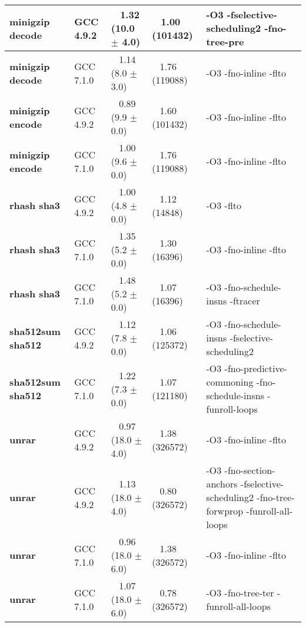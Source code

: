 \begin{tabular}{|l|l|p{0.9in}|p{0.9in}|p{3.0in}|}
     \hline
      \textbf{ minigzip decode } &  GCC 4.9.2  &  ~ 1.32 (10.0 $\pm$ 4.0)  &  ~ 1.00 (101432)  & {\small -O3 -fselective-scheduling2 -fno-tree-pre }\\
     \hline
      \textbf{ minigzip decode } &  GCC 7.1.0  &  ~ 1.14 (8.0 $\pm$ 3.0)  &  ~ 1.76 (119088)  & {\small -O3 -fno-inline -flto }\\
     \hline
      \textbf{ minigzip encode } &  GCC 4.9.2  &  ~ 0.89 (9.9 $\pm$ 0.0)  &  ~ 1.60 (101432)  & {\small -O3 -fno-inline -flto }\\
     \hline
      \textbf{ minigzip encode } &  GCC 7.1.0  &  ~ 1.00 (9.6 $\pm$ 0.0)  &  ~ 1.76 (119088)  & {\small -O3 -fno-inline -flto }\\
     \hline
      \textbf{ rhash sha3 } &  GCC 4.9.2  &  ~ 1.00 (4.8 $\pm$ 0.0)  &  ~ 1.12 (14848)  & {\small -O3 -flto }\\
     \hline
      \textbf{ rhash sha3 } &  GCC 7.1.0  &  ~ 1.35 (5.2 $\pm$ 0.0)  &  ~ 1.30 (16396)  & {\small -O3 -fno-inline -flto }\\
     \hline
      \textbf{ rhash sha3 } &  GCC 7.1.0  &  ~ 1.48 (5.2 $\pm$ 0.0)  &  ~ 1.07 (16396)  & {\small -O3 -fno-schedule-insns -ftracer }\\
     \hline
      \textbf{ sha512sum sha512 } &  GCC 4.9.2  &  ~ 1.12 (7.8 $\pm$ 0.0)  &  ~ 1.06 (125372)  & {\small -O3 -fno-schedule-insns -fselective-scheduling2 }\\
     \hline
      \textbf{ sha512sum sha512 } &  GCC 7.1.0  &  ~ 1.22 (7.3 $\pm$ 0.0)  &  ~ 1.07 (121180)  & {\small -O3 -fno-predictive-commoning -fno-schedule-insns -funroll-loops }\\
     \hline
      \textbf{ unrar } &  GCC 4.9.2  &  ~ 0.97 (18.0 $\pm$ 4.0)  &  ~ 1.38 (326572)  & {\small -O3 -fno-inline -flto }\\
     \hline
      \textbf{ unrar } &  GCC 4.9.2  &  ~ 1.13 (18.0 $\pm$ 4.0)  &  ~ 0.80 (326572)  & {\small -O3 -fno-section-anchors -fselective-scheduling2 -fno-tree-forwprop -funroll-all-loops }\\
     \hline
      \textbf{ unrar } &  GCC 7.1.0  &  ~ 0.96 (18.0 $\pm$ 6.0)  &  ~ 1.38 (326572)  & {\small -O3 -fno-inline -flto }\\
     \hline
      \textbf{ unrar } &  GCC 7.1.0  &  ~ 1.07 (18.0 $\pm$ 6.0)  &  ~ 0.78 (326572)  & {\small -O3 -fno-tree-ter -funroll-all-loops }\\
     \hline
    \end{tabular}    
